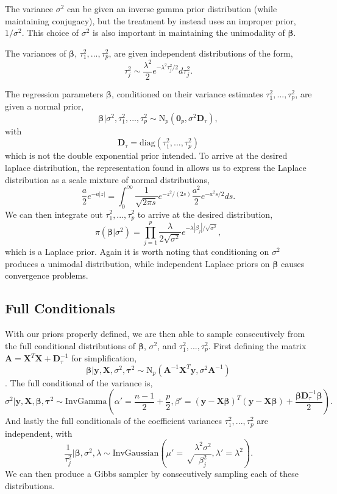 \documentclass{uwstat572}
\begin{document}
The variance $\sigma^2$ can be given an inverse gamma prior distribution (while maintaining conjugacy), but the treatment by \cite{park2008bayesian} instead uses an improper prior, $1/\sigma^2$. This choice of $\sigma^2$ is also important in maintaining the unimodality of $\boldsymbol\beta$.

The variances of $\boldsymbol\beta$, $\tau_1^2,...,\tau_p^2$, are given independent distributions of the form, \[ \tau^2_j \sim \frac{\lambda^2}{2}e^{-\lambda^2\tau^2_j/2}d\tau^2_j.\] 

The regression parameters $\boldsymbol\beta$, conditioned on their variance estimates $\tau_1^2,...,\tau_p^2$, are given a normal prior, \[ 
\boldsymbol\beta|\sigma^2,\tau^2_1,...,\tau^2_p\sim\text{N}_p(\mathbf{0}_p,\sigma^2\mathbf{D}_\tau),\] with \[ \mathbf{D}_\tau=\text{diag}(\tau_1^2,...,\tau^2_p) \] which is not the double exponential prior intended. To arrive at the desired laplace distribution, the representation found in \cite{andrews1974scale} allows us to express the Laplace distribution as a scale mixture of normal distributions, \[ \frac{a}{2}e^{-a|z|}=\int^\infty_0
\frac{1}{\sqrt{2\pi s}}e^{-z^2/(2s)}\frac{a^2}{2}e^{-a^2s/2}ds.\] We can then integrate out $\tau^2_1,...,\tau^2_p$ to arrive at the desired distribution, \[ \pi(\boldsymbol\beta|\sigma^2)=\prod^p_{j=1}\frac{\lambda}{2\sqrt{\sigma^2}}e^{-\lambda|\beta_j|/\sqrt{\sigma^2}}, \] which is a Laplace prior. Again it is worth noting that conditioning on $\sigma^2$ produces a unimodal distribution, while independent Laplace priors on $\boldsymbol\beta$ causes convergence problems.

\subsection{Full Conditionals}
With our priors properly defined, we are then able to sample consecutively from the full conditional distributions of $\boldsymbol\beta$, $\sigma^2$, and $\tau^2_1,...,\tau^2_p$. First defining the matrix $\mathbf{A}=\mathbf{X}^T\mathbf{X}+\mathbf{D}_\tau^{-1}$ for simplification, \[
\boldsymbol\beta|\mathbf{y},\mathbf{X},\sigma^2,\boldsymbol\tau^2 \sim \text{N}_p(\mathbf{A}^{-1}\mathbf{X}^T\mathbf{y},\sigma^2\mathbf{A}^{-1}) \]. The full conditional of the variance is, \[ \sigma^2|\mathbf{y},\mathbf{X},\boldsymbol\beta,\boldsymbol\tau^2 \sim \text{InvGamma}\left(\alpha'=\frac{n-1}{2}+\frac{p}{2},\beta'=(\mathbf{y}-\mathbf{X}\boldsymbol\beta)^T(\mathbf{y}-\mathbf{X}\boldsymbol\beta)+\frac{\boldsymbol\beta\mathbf{D}_\tau^{-1}\boldsymbol\beta}{2}\right). \] And lastly the full conditionals of the coefficient variances $\tau^2_1,...,\tau^2_p$ are independent, with \[
\frac{1}{\tau_j^2} | \boldsymbol\beta, \sigma^2, \lambda \sim \text{InvGaussian}\left(\mu'=\sqrt\frac{\lambda^2\sigma^2}{\beta_j^2}, \lambda'=\lambda^2\right). \] We can then produce a Gibbs sampler by consecutively sampling each of these distributions.
\end{document}
